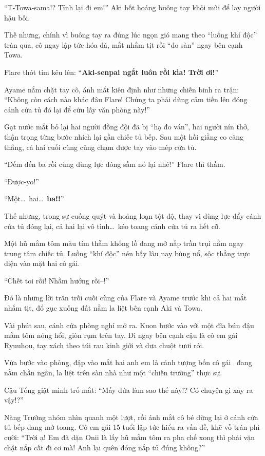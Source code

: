 \documentclass[../main.tex]{subfiles}
\begin{document}
``T-Towa-sama!? Tỉnh lại đi em!'' Aki hốt hoảng buông tay khỏi mũi để lay người hậu bối.

Thế nhưng, chính vì buông tay ra đúng lúc ngọn gió mang theo ``luồng khí độc'' tràn qua, cô ngay lập tức hóa đá, mắt nhắm tịt rồi ``đo sàn'' ngay bên cạnh Towa.

Flare thót tim kêu lên: ``\textbf{Aki-senpai ngất luôn rồi kìa! Trời ơi!}''

Ayame nắm chặt tay cô, ánh mắt kiên định như những chiến binh ra trận: ``Không còn cách nào khác đâu Flare! Chúng ta phải dũng cảm tiến lên đóng cánh cửa tủ đó lại để cứu lấy văn phòng này!''

Gạt nước mắt bỏ lại hai người đồng đội đã bị ``hạ đo ván'', hai người nín thở, thận trọng từng bước nhích lại gần chiếc tủ bếp. Sau một hồi giằng co căng thẳng, cả hai cuối cùng cũng chạm được tay vào mép cửa tủ.

``Đếm đến ba rồi cùng dùng lực đóng sầm nó lại nhé!'' Flare thì thầm.

``Được-yo!''

``Một\dots\ hai\dots\ \textbf{ba!!}''

Thế nhưng, trong sự cuống quýt và hoảng loạn tột độ, thay vì dùng lực đẩy cánh cửa tủ đóng lại, cả hai lại vô tình\dots\ kéo toang cánh cửa tủ ra hết cỡ.

Một hũ mắm tôm màu tím thẫm khổng lồ đang mở nắp trần trụi nằm ngay trung tâm chiếc tủ. Luồng ``khí độc'' nén bấy lâu nay bùng nổ, sộc thẳng trực diện vào mặt hai cô gái.

``Chết toi rồi! Nhầm hướng rồi--!''

Đó là những lời trăn trối cuối cùng của Flare và Ayame trước khi cả hai mắt nhắm tịt, đổ gục xuống đất nằm la liệt bên cạnh Aki và Towa.

Vài phút sau, cánh cửa phòng nghỉ mở ra. Kuon bước vào với một đĩa bún đậu mắm tôm nóng hổi, giòn rụm trên tay. Đi ngay bên cạnh cậu là cô em gái Ryuuhou, tay xách theo túi rau kinh giới và dưa chuột tươi rói.

Vừa bước vào phòng, đập vào mắt hai anh em là cảnh tượng bốn cô gái \hll\ đang nằm chần ngần, la liệt trên sàn nhà như một ``chiến trường'' thực sự.

Cậu Tổng giật mình trố mắt: ``Mấy đứa làm sao thế này!? Có chuyện gì xảy ra vậy!?''

Nàng Trưởng nhóm nhìn quanh một lượt, rồi ánh mắt cô bé dừng lại ở cánh cửa tủ bếp đang mở toang. Cô em gái 15 tuổi lập tức hiểu ra vấn đề, khẽ vỗ trán phì cười: ``Trời ạ! Em đã dặn Onii là lấy hũ mắm tôm ra pha chế xong thì phải vặn chặt nắp cất đi cơ mà! Anh lại quên đóng nắp tủ đúng không?''
\end{document}
